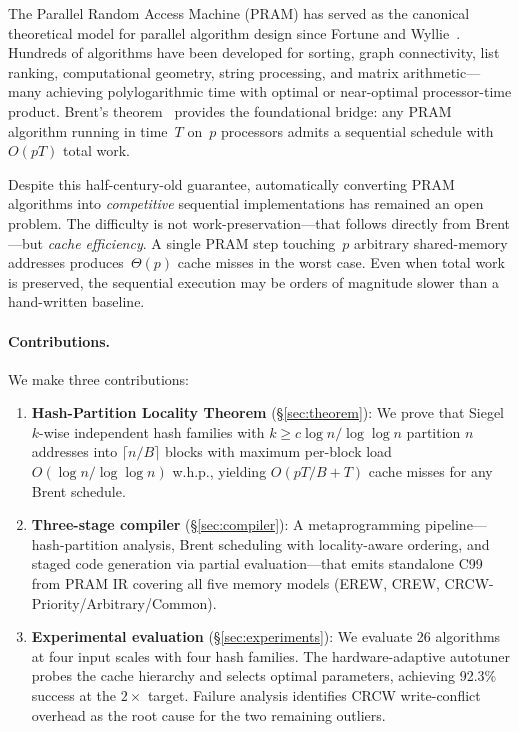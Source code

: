 \documentclass[11pt]{article}
\begin{document}
The Parallel Random Access Machine (PRAM) has served as the canonical
theoretical model for parallel algorithm design since
Fortune and Wyllie~\cite{fortune1978parallelism}.  Hundreds of algorithms
have been developed for sorting, graph connectivity, list ranking,
computational geometry, string processing, and matrix arithmetic---many
achieving polylogarithmic time with optimal or near-optimal processor-time
product.  Brent's theorem~\cite{brent1974} provides the foundational bridge:
any PRAM algorithm running in time~$T$ on~$p$ processors admits a
sequential schedule with~$O(pT)$ total work.

Despite this half-century-old guarantee, automatically converting PRAM
algorithms into \emph{competitive} sequential implementations has remained
an open problem.  The difficulty is not work-preservation---that follows
directly from Brent---but \emph{cache efficiency}.  A single PRAM step
touching~$p$ arbitrary shared-memory addresses produces~$\Theta(p)$ cache
misses in the worst case.  Even when total work is preserved, the sequential
execution may be orders of magnitude slower than a hand-written baseline.

\paragraph{Contributions.}  We make three contributions:

\begin{enumerate}[leftmargin=*]
\item \textbf{Hash-Partition Locality Theorem} (\S\ref{sec:theorem}):
  We prove that Siegel $k$-wise independent hash families with
  $k \ge c\log n/\log\log n$ partition $n$ addresses into
  $\lceil n/B \rceil$ blocks with maximum per-block load
  $O(\!\log n/\log\log n)$ w.h.p., yielding $O(pT/B + T)$ cache misses
  for any Brent schedule.

\item \textbf{Three-stage compiler} (\S\ref{sec:compiler}):
  A metaprogramming pipeline---hash-partition analysis, Brent scheduling
  with locality-aware ordering, and staged code generation via partial
  evaluation---that emits standalone C99 from PRAM IR covering all five
  memory models (EREW, CREW, CRCW-Priority/Arbitrary/Common).

\item \textbf{Experimental evaluation} (\S\ref{sec:experiments}):
  We evaluate 26 algorithms at four input scales with four hash families.
  The hardware-adaptive autotuner probes the cache hierarchy and selects
  optimal parameters, achieving 92.3\% success at the $2\times$ target.
  Failure analysis identifies CRCW write-conflict overhead as the root
  cause for the two remaining outliers.
\end{enumerate}
\end{document}
